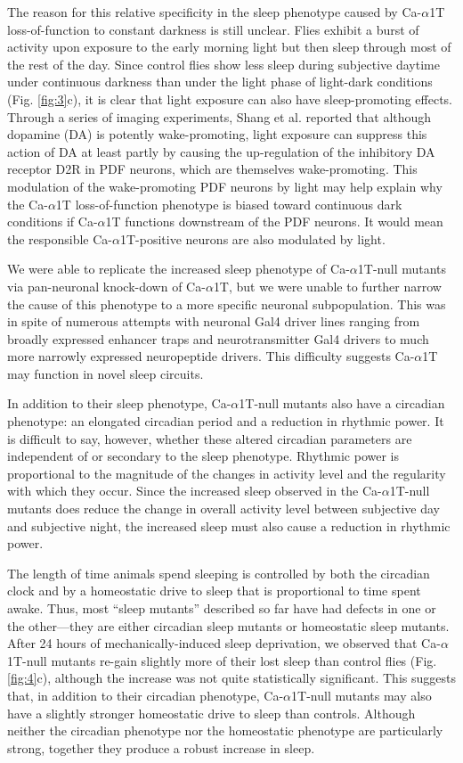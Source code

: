 The reason for this relative specificity in the sleep phenotype caused by Ca-$\alpha$1T loss-of-function to constant darkness is still unclear.
Flies exhibit a burst of activity upon exposure to the early morning light but then sleep through most of the rest of the day.
Since control flies show less sleep during subjective daytime under continuous darkness than under the light phase of light-dark conditions (Fig. \ref{fig:3}c), it is clear that light exposure can also have sleep-promoting effects.
Through a series of imaging experiments, Shang et al. reported that although dopamine (DA) is potently wake-promoting, light exposure can suppress this action of DA at least partly by causing the up-regulation of the inhibitory DA receptor D2R in PDF neurons, which are themselves wake-promoting\cite{shang:2011aa}.
This modulation of the wake-promoting PDF neurons by light may help explain why the Ca-$\alpha$1T loss-of-function phenotype is biased toward continuous dark conditions if Ca-$\alpha$1T functions downstream of the PDF neurons. It would mean the responsible Ca-$\alpha$1T-positive neurons are also modulated by light.

We were able to replicate the increased sleep phenotype of Ca-$\alpha$1T-null mutants via pan-neuronal knock-down of Ca-$\alpha$1T, but we were unable to further narrow the cause of this phenotype to a more specific neuronal subpopulation.
This was in spite of numerous attempts with neuronal Gal4 driver lines ranging from broadly expressed enhancer traps and neurotransmitter Gal4 drivers to much more narrowly expressed neuropeptide drivers.
This difficulty suggests Ca-$\alpha$1T may function in novel sleep circuits.

In addition to their sleep phenotype, Ca-$\alpha$1T-null mutants also have a circadian phenotype: an elongated circadian period and a reduction in rhythmic power.
It is difficult to say, however, whether these altered circadian parameters are independent of or secondary to the sleep phenotype.
Rhythmic power is proportional to the magnitude of the changes in activity level and the regularity with which they occur.
Since the increased sleep observed in the Ca-$\alpha$1T-null mutants does reduce the change in overall activity level between subjective day and subjective night, the increased sleep must also cause a reduction in rhythmic power.

The length of time animals spend sleeping is controlled by both the circadian clock and by a homeostatic drive to sleep that is proportional to time spent awake.
Thus, most ``sleep mutants'' described so far have had defects in one or the other---they are either circadian sleep mutants or homeostatic sleep mutants.
After 24 hours of mechanically-induced sleep deprivation, we observed that Ca-$\alpha$1T-null mutants re-gain slightly more of their lost sleep than control flies (Fig. \ref{fig:4}c), although the increase was not quite statistically significant.
This suggests that, in addition to their circadian phenotype, Ca-$\alpha$1T-null mutants may also have a slightly stronger homeostatic drive to sleep than controls.
Although neither the circadian phenotype nor the homeostatic phenotype are particularly strong, together they produce a robust increase in sleep.

